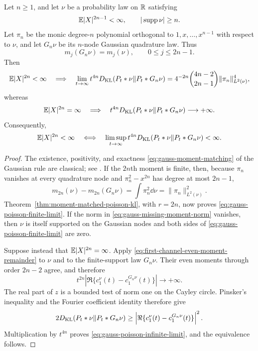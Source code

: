 \begin{theorem}
\label{thm:gauss-poisson-kl-threshold}
Let \(n\ge1\), and let \(\nu\) be a probability law on \(\mathbb{R}\) satisfying
\[
 \mathbb{E}|X|^{2n-1}<\infty,
 \qquad |\operatorname{supp}\nu|\ge n.
\]
Let \(\pi_n\) be the monic degree-\(n\) polynomial orthogonal to
\(1,x,\ldots,x^{n-1}\) with respect to \(\nu\), and let \(G_n\nu\) be its
\(n\)-node Gaussian quadrature law.  Thus
\begin{equation}\label{eq:gauss-moment-matching}
 m_j(G_n\nu)=m_j(\nu),\qquad 0\le j\le2n-1.
\end{equation}
Then
\begin{equation}\label{eq:gauss-poisson-finite-limit}
 \mathbb{E}|X|^{2n}<\infty
 \quad\Longrightarrow\quad
 \lim_{t\to\infty}t^{4n}
 D_{\rm KL}(P_t*\nu\|P_t*G_n\nu)
 =4^{-2n}\binom{4n-2}{2n-1}
 \|\pi_n\|_{L^2(\nu)}^4,
\end{equation}
whereas
\begin{equation}\label{eq:gauss-poisson-infinite-limit}
 \mathbb{E}|X|^{2n}=\infty
 \quad\Longrightarrow\quad
 t^{4n}D_{\rm KL}(P_t*\nu\|P_t*G_n\nu)\longrightarrow+\infty.
\end{equation}
Consequently,
\begin{equation}\label{eq:gauss-poisson-moment-equivalence}
 \mathbb{E}|X|^{2n}<\infty
 \quad\Longleftrightarrow\quad
 \limsup_{t\to\infty}t^{4n}
 D_{\rm KL}(P_t*\nu\|P_t*G_n\nu)<\infty.
\end{equation}
\end{theorem}

\begin{proof}
The existence, positivity, and exactness
\eqref{eq:gauss-moment-matching} of the Gaussian rule are classical; see
\cite{GolubWelsch1969GaussQuadrature}.  If the \(2n\)th moment is finite,
then, because \(\pi_n\) vanishes at every quadrature node and
\(\pi_n^2-x^{2n}\) has degree at most \(2n-1\),
\begin{equation}\label{eq:gauss-missing-moment-norm}
 m_{2n}(\nu)-m_{2n}(G_n\nu)
 =\int\pi_n^2\dd\nu=\|\pi_n\|_{L^2(\nu)}^2.
\end{equation}
Theorem~\ref{thm:moment-matched-poisson-kl}, with \(r=2n\), now proves
\eqref{eq:gauss-poisson-finite-limit}.  If the norm in
\eqref{eq:gauss-missing-moment-norm} vanishes, then \(\nu\) is itself
supported on the Gaussian nodes and both sides of
\eqref{eq:gauss-poisson-finite-limit} are zero.

Suppose instead that \(\mathbb{E}|X|^{2n}=\infty\).  Apply
\eqref{eq:first-channel-even-moment-remainder} to \(\nu\) and to the
finite-support law \(G_n\nu\).  Their even moments through order \(2n-2\)
agree, and therefore
\[
 t^{2n}\left|\Re\{c_1^\nu(t)-c_1^{G_n\nu}(t)\}\right|
 \longrightarrow+\infty.
\]
The real part of \(z\) is a bounded test of norm one on the Cayley circle.
Pinsker's inequality and the Fourier coefficient identity therefore give
\[
 2D_{\rm KL}(P_t*\nu\|P_t*G_n\nu)
 \ge\left|\Re\{c_1^\nu(t)-c_1^{G_n\nu}(t)\}\right|^2.
\]
Multiplication by \(t^{4n}\) proves
\eqref{eq:gauss-poisson-infinite-limit}, and the equivalence follows.
\end{proof}

